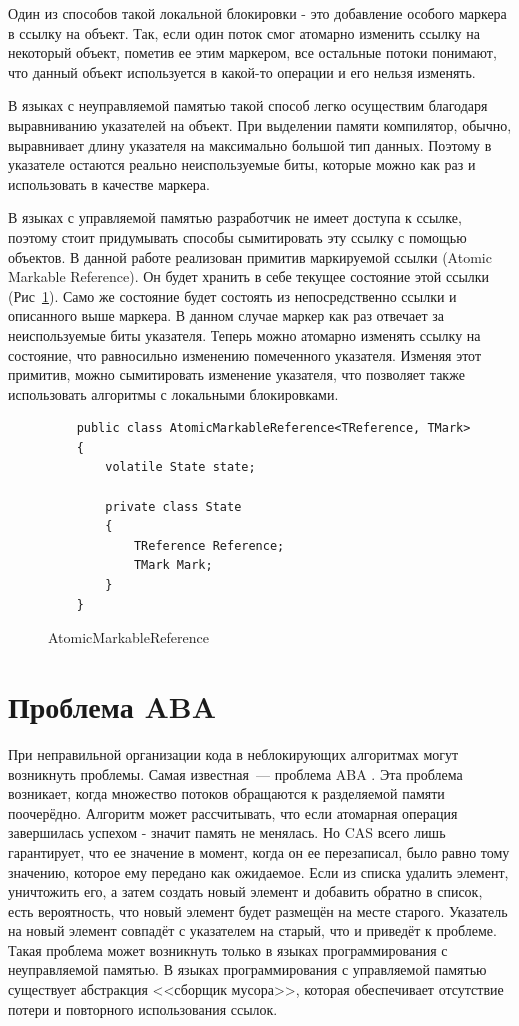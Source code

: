 \documentclass[12pt]{report}
\begin{document}
{		Один из способов такой локальной блокировки - это добавление особого маркера в ссылку на объект. Так, если один поток смог атомарно изменить ссылку на некоторый объект, пометив ее этим маркером, все остальные потоки понимают, что данный объект используется в какой-то операции и его нельзя изменять. 
		
		В языках с неуправляемой памятью такой способ легко осуществим благодаря выравниванию указателей на объект. При выделении памяти компилятор, обычно, выравнивает длину указателя на максимально большой тип данных. Поэтому в указателе остаются реально неиспользуемые биты, которые можно как раз и использовать в качестве маркера.
		
		В языках с управляемой памятью разработчик не имеет доступа к ссылке, поэтому стоит придумывать способы сымитировать эту ссылку с помощью объектов. В данной работе реализован примитив маркируемой ссылки (Atomic Markable Reference). Он будет хранить в себе текущее состояние этой ссылки (Рис~\ref{pic:AMR}). Само же состояние будет состоять из непосредственно ссылки и описанного выше маркера. В данном случае маркер как раз отвечает за неиспользуемые биты указателя. Теперь можно атомарно изменять ссылку на состояние, что равносильно изменению помеченного указателя. Изменяя этот примитив, можно сымитировать изменение указателя, что позволяет также использовать алгоритмы с локальными блокировками. 		
		\begin{figure}[h]
			\begin{lstlisting}
	public class AtomicMarkableReference<TReference, TMark>
	{
		volatile State state;
		
		private class State
		{
			TReference Reference;
			TMark Mark;
		}
	}
			\end{lstlisting}
			\caption{AtomicMarkableReference}
			\label{pic:AMR}
		\end{figure}
		
		\section{Проблема ABA}
		
		При неправильной организации кода в неблокирующих алгоритмах могут возникнуть проблемы. Самая известная~--- проблема ABA \cite{ABA}. Эта проблема возникает, когда множество потоков обращаются к разделяемой памяти поочерёдно. Алгоритм может рассчитывать, что если атомарная операция завершилась успехом - значит память не менялась. Но CAS всего лишь гарантирует, что ее значение в момент, когда он ее перезаписал, было равно тому значению, которое ему передано как ожидаемое. Если из списка удалить элемент, уничтожить его, а затем создать новый элемент и добавить обратно в список, есть вероятность, что новый элемент будет размещён на месте старого. Указатель на новый элемент совпадёт с указателем на старый, что и приведёт к проблеме. Такая проблема может возникнуть только в языках программирования с неуправляемой памятью. В языках программирования с управляемой памятью существует абстракция <<сборщик мусора>>, которая обеспечивает отсутствие потери и повторного использования ссылок.
		
}
\end{document}
